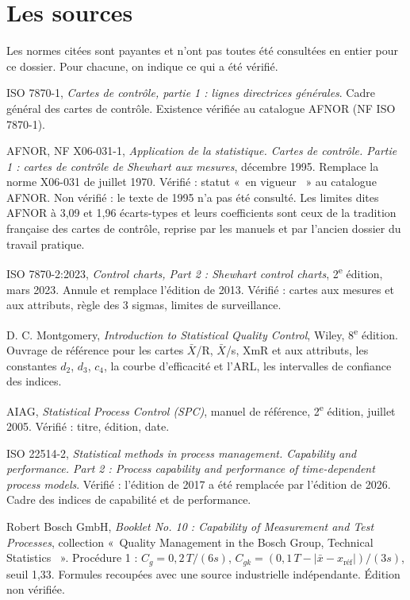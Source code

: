 \documentclass[11pt,a4paper]{article}
\providecommand{\og}{«~}\providecommand{\fg}{~»}
\begin{document}
\section{Les sources}\label{sec:E}
Les normes citées sont payantes et n'ont pas toutes été consultées en entier pour ce dossier. Pour chacune, on indique ce qui a été vérifié.
\small
\begin{enumerate}[label={[\arabic*]},leftmargin=2.2em,itemsep=2pt]
\item ISO 7870-1, \emph{Cartes de contrôle, partie 1 : lignes directrices générales}. Cadre général des cartes de contrôle. Existence vérifiée au catalogue AFNOR (NF ISO 7870-1).
\item AFNOR, NF X06-031-1, \emph{Application de la statistique. Cartes de contrôle. Partie 1 : cartes de contrôle de Shewhart aux mesures}, décembre 1995. Remplace la norme X06-031 de juillet 1970. Vérifié : statut \og en vigueur \fg{} au catalogue AFNOR. Non vérifié : le texte de 1995 n'a pas été consulté. Les limites dites AFNOR à 3,09 et 1,96 écarts-types et leurs coefficients sont ceux de la tradition française des cartes de contrôle, reprise par les manuels et par l'ancien dossier du travail pratique.
\item ISO 7870-2:2023, \emph{Control charts, Part 2 : Shewhart control charts}, 2\textsuperscript{e} édition, mars 2023. Annule et remplace l'édition de 2013. Vérifié : cartes aux mesures et aux attributs, règle des 3 sigmas, limites de surveillance.
\item D. C. Montgomery, \emph{Introduction to Statistical Quality Control}, Wiley, 8\textsuperscript{e} édition. Ouvrage de référence pour les cartes $\bar X$/R, $\bar X$/s, XmR et aux attributs, les constantes $d_2$, $d_3$, $c_4$, la courbe d'efficacité et l'ARL, les intervalles de confiance des indices.
\item AIAG, \emph{Statistical Process Control (SPC)}, manuel de référence, 2\textsuperscript{e} édition, juillet 2005. Vérifié : titre, édition, date.
\item ISO 22514-2, \emph{Statistical methods in process management. Capability and performance. Part 2 : Process capability and performance of time-dependent process models}. Vérifié : l'édition de 2017 a été remplacée par l'édition de 2026. Cadre des indices de capabilité et de performance.
\item Robert Bosch GmbH, \emph{Booklet No. 10 : Capability of Measurement and Test Processes}, collection \og Quality Management in the Bosch Group, Technical Statistics \fg. Procédure 1 : $C_g=0{,}2\,T/(6s)$, $C_{gk}=(0{,}1\,T-|\bar x-x_{\text{réf}}|)/(3s)$, seuil 1,33. Formules recoupées avec une source industrielle indépendante. Édition non vérifiée.

\end{enumerate}
\end{document}
